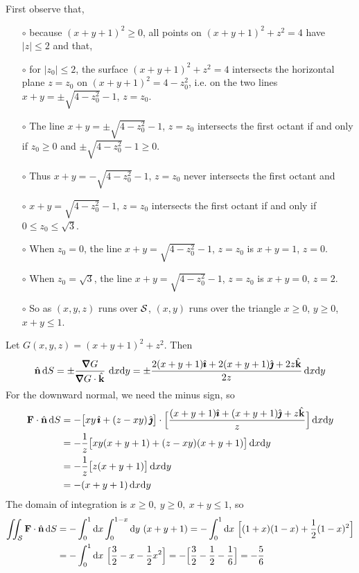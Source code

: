 \begin{solution} 
First observe that, 
\begin{itemize}\itemsep1pt \parskip0pt  %
\item[$\circ$]
because $(x+y+1)^2\ge 0$,
 all points on $(x+y+1)^2+z^2=4$ have $|z|\le 2$ 
and that, 
\item[$\circ$]
for $|z_0|\le 2$, the surface $(x+y+1)^2+z^2=4$
intersects the horizontal plane $z=z_0$ on $(x+y+1)^2 = 4-z_0^2$,
i.e. on the two lines $x+y=\pm\sqrt{4-z_0^2}-1$, $z=z_0$.
\item[$\circ$]
The line $x+y=\pm\sqrt{4-z_0^2}-1$, $z=z_0$
intersects the first octant if and only if $z_0\ge0$ and
$\pm\sqrt{4-z_0^2}-1\ge 0$. 
\item[$\circ$]
Thus $x+y=-\sqrt{4-z_0^2}-1$, $z=z_0$ never intersects the first octant and
\item[$\circ$]
 $x+y=\sqrt{4-z_0^2}-1$, $z=z_0$
intersects the first octant if and only if $0\le z_0\le \sqrt{3}$.
\item[$\circ$] When $z_0=0$, the line $x+y=\sqrt{4-z_0^2}-1$, $z=z_0$
is $x+y=1$, $z=0$.
\item[$\circ$] When $z_0=\sqrt{3}$, the line $x+y=\sqrt{4-z_0^2}-1$, $z=z_0$
is $x+y=0$, $z=2$.
\item[$\circ$] So as $(x,y,z)$ runs over $\mathcal{S}$, $(x,y)$ runs over the
triangle $x\ge0$, $y\ge 0$, $x+y\le 1$.
\end{itemize}
Let $G(x,y,z)=(x+y+1)^2+z^2$. Then
$$
\hn\,\dee{S}=\pm\frac{\vnabla G}{\vnabla G\cdot\hk}\ \dee{x}\dee{y}
=\pm\frac{2(x+y+1)\hi+2(x+y+1)\hj+2z\hk}{2z}\,\dee{x}\dee{y}
$$
For the downward normal, we need the minus sign, so
\begin{align*}
\mathbf{F}\cdot\hat{\mathbf{n}}\,\mathrm{d}S
&=-\big[xy\,\hat{\pmb{\imath}}+(z-xy)\,\hat{\pmb{\jmath}}\big]\cdot
  \Big[\frac{(x+y+1)\hat{\pmb{\imath}}+(x+y+1)\hat{\pmb{\jmath}}+z\hat{\mathbf{k}}}{z}\Big]\,\mathrm{d}x\mathrm{d}y\\
&=-\frac{1}{z}\big[xy(x+y+1)+(z-xy)(x+y+1)\big]\,\mathrm{d}x\mathrm{d}y\\
&=-\frac{1}{z}\big[z(x+y+1)\big]\,\mathrm{d}x\mathrm{d}y\\
&=-(x+y+1)\,\mathrm{d}x\mathrm{d}y
\end{align*}
The domain of integration is $x\ge 0,\ y\ge 0,\ x+y\le 1$, so
\begin{align*}
\iint_{\mathcal{S}}\mathbf{F}\cdot\hat{\mathbf{n}}\,\mathrm{d}S
&=-\int_0^1 \mathrm{d}x\int_0^{1-x} \mathrm{d}y \ (x+y+1)
=-\int_0^1 \mathrm{d}x\ \Big[(1+x)(1-x)+\frac{1}{2}(1-x)^2\Big]\\
&=-\int_0^1 \mathrm{d}x\ \Big[\frac{3}{2}-x-\frac{1}{2} x^2\Big]
=-\Big[\frac{3}{2}-\frac{1}{2}-\frac{1}{6}\Big]
=-\frac{5}{6}
\end{align*}
\end{solution}
